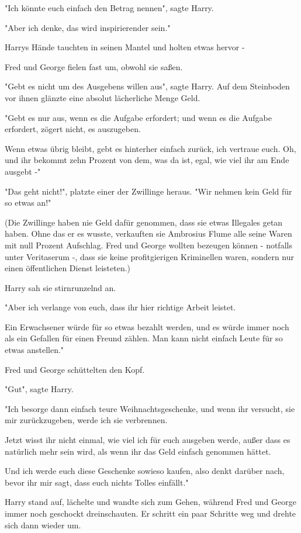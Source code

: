 {"Ich könnte euch einfach den Betrag nennen", sagte Harry.

"Aber ich denke, das wird inspirierender sein."

Harrys Hände tauchten in seinen Mantel und holten etwas hervor -

Fred und George fielen fast um, obwohl sie saßen.

"Gebt es nicht um des Ausgebens willen aus", sagte Harry. Auf dem Steinboden vor ihnen glänzte eine absolut lächerliche Menge Geld.

"Gebt es nur aus, wenn es die Aufgabe erfordert; und wenn es die Aufgabe erfordert, zögert nicht, es auszugeben.

Wenn etwas übrig bleibt, gebt es hinterher einfach zurück, ich vertraue euch. Oh, und ihr bekommt zehn Prozent von dem, was da ist, egal, wie viel ihr am Ende ausgebt -"

"Das geht nicht!", platzte einer der Zwillinge heraus. "Wir nehmen kein Geld für so etwas an!"

(Die Zwillinge haben nie Geld dafür genommen, dass sie etwas Illegales getan haben. Ohne das er es wusste, verkauften sie Ambrosius Flume alle seine Waren mit null Prozent Aufschlag. Fred und George wollten bezeugen können - notfalls unter Veritaserum -, dass sie keine profitgierigen Kriminellen waren, sondern nur einen öffentlichen Dienst leisteten.)

Harry sah sie stirnrunzelnd an.

"Aber ich verlange von euch, dass ihr hier richtige Arbeit leistet.

Ein Erwachsener würde für so etwas bezahlt werden, und es würde immer noch als ein Gefallen für einen Freund zählen. Man kann nicht einfach Leute für so etwas anstellen."

Fred und George schüttelten den Kopf.

"Gut", sagte Harry.

"Ich besorge dann einfach teure Weihnachtsgeschenke, und wenn ihr versucht, sie mir zurückzugeben, werde ich sie verbrennen.

Jetzt wisst ihr nicht einmal, wie viel ich für euch ausgeben werde, außer dass es natürlich mehr sein wird, als wenn ihr das Geld einfach genommen hättet.

Und ich werde euch diese Geschenke sowieso kaufen, also denkt darüber nach, bevor ihr mir sagt, dass euch nichts Tolles einfällt."

Harry stand auf, lächelte und wandte sich zum Gehen, während Fred und George immer noch geschockt dreinschauten. Er schritt ein paar Schritte weg und drehte sich dann wieder um.

}
